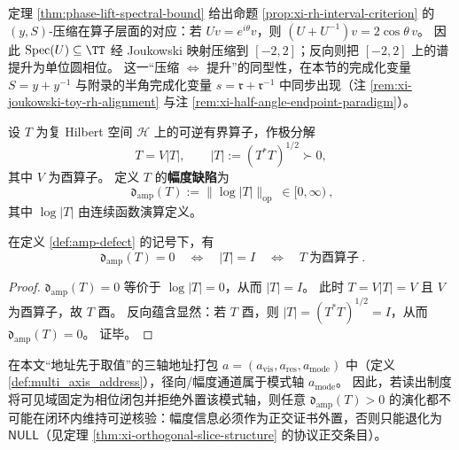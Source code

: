\begin{remark}\label{rem:phase-lift-joukowski-operator}
定理 \ref{thm:phase-lift-spectral-bound} 给出命题 \ref{prop:xi-rh-interval-criterion} 的 \((y,S)\)-压缩在算子层面的对应：若 \(Uv=e^{i\theta}v\)，则 \((U+U^{-1})v=2\cos\theta\,v\)。
因此 \(\mathrm{Spec}(U)\subseteq\TT\) 经 Joukowski 映射压缩到 \([-2,2]\)；反向则把 \([-2,2]\) 上的谱提升为单位圆相位。
这一“压缩 \(\Leftrightarrow\) 提升”的同型性，在本节的完成化变量 \(S=y+y^{-1}\) 与附录的半角完成化变量 \(s=\mathfrak{r}+\mathfrak{r}^{-1}\) 中同步出现（注 \ref{rem:xi-joukowski-toy-rh-alignment} 与注 \ref{rem:xi-half-angle-endpoint-paradigm}）。
\end{remark}

\begin{definition}\label{def:amp-defect}
设 \(T\) 为复 Hilbert 空间 \(\mathcal H\) 上的可逆有界算子，作极分解
\[
T=V|T|,\qquad |T|:=(T^\ast T)^{1/2}\succ 0,
\]
其中 \(V\) 为酉算子。
定义 \(T\) 的\textbf{幅度缺陷}为
\[
\boxed{\ \mathfrak{d}_{\mathrm{amp}}(T):=\bigl\|\log|T|\bigr\|_{\mathrm{op}}\ \in[0,\infty)\ },
\]
其中 \(\log|T|\) 由连续函数演算定义。
\end{definition}

\begin{proposition}\label{prop:amp-defect-unitary}
在定义 \ref{def:amp-defect} 的记号下，有
\[
\boxed{\ \mathfrak{d}_{\mathrm{amp}}(T)=0\quad\Longleftrightarrow\quad |T|=I\quad\Longleftrightarrow\quad T\ \text{为酉算子}\ }.
\]
\end{proposition}
\begin{proof}
\(\mathfrak{d}_{\mathrm{amp}}(T)=0\) 等价于 \(\log|T|=0\)，从而 \(|T|=I\)。
此时 \(T=V|T|=V\) 且 \(V\) 为酉算子，故 \(T\) 酉。
反向蕴含显然：若 \(T\) 酉，则 \(|T|=(T^\ast T)^{1/2}=I\)，从而 \(\mathfrak{d}_{\mathrm{amp}}(T)=0\)。
证毕。
\end{proof}

\begin{remark}[与三轴地址语义的对齐]\label{rem:amp-defect-address-axis}
在本文“地址先于取值”的三轴地址打包 \(a=(a_{\mathrm{vis}},a_{\mathrm{res}},a_{\mathrm{mode}})\) 中（定义 \ref{def:multi_axis_address}），径向/幅度通道属于模式轴 \(a_{\mathrm{mode}}\)。
因此，若读出制度将可见域固定为相位闭包并拒绝外置该模式轴，则任意 \(\mathfrak{d}_{\mathrm{amp}}(T)>0\) 的演化都不可能在闭环内维持可逆核验：幅度信息必须作为正交证书外置，否则只能退化为 \(\mathsf{NULL}\)（见定理 \ref{thm:xi-orthogonal-slice-structure} 的协议正交条目）。
\end{remark}

